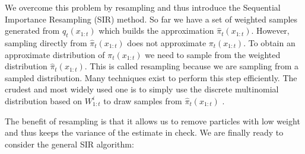 \documentclass[../masters.tex]{subfiles}
\begin{document}
We overcome this problem by resampling and thus introduce the Sequential Importance Resampling (SIR) method. So far we have a set of weighted samples generated from $q_t(x_{1:t})$ which builds the approximation $\hat{\pi}_t(x_{1:t})$. However, sampling directly from $\hat{\pi}_t(x_{1:t})$ does not approximate $\pi_t(x_{1:t})$. To obtain an approximate distribution of $\pi_t(x_{1:t})$ we need to sample from the weighted distribution $\hat{\pi}_t(x_{1:t})$. This is called resampling because we are sampling from a sampled distribution. Many techniques exist to perform this step efficiently. The crudest and most widely used one is to simply use the discrete multinomial distribution based on $W^i_{1:t}$ to draw samples from $\hat{\pi}_t(x_{1:t})$ \cite{pftut}. 

The benefit of resampling is that it allows us to remove particles with low weight and thus keeps the variance of the estimate in check. We are finally ready to consider the general SIR  algorithm:
\end{document}
